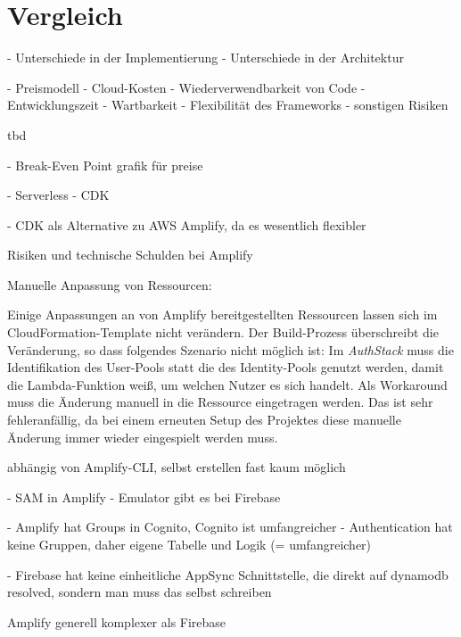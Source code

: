 \chapter{Vergleich}

- Unterschiede in der Implementierung
- Unterschiede in der Architektur

- Preismodell
- Cloud-Kosten
- Wiederverwendbarkeit von Code
- Entwicklungszeit
- Wartbarkeit
- Flexibilität des Frameworks
- sonstigen Risiken

tbd

- Break-Even Point grafik für preise

- Serverless
- CDK

- CDK als Alternative zu AWS Amplify, da es wesentlich flexibler

Risiken und technische Schulden bei Amplify

Manuelle Anpassung von Ressourcen:

Einige Anpassungen an von Amplify bereitgestellten Ressourcen lassen sich im CloudFormation-Template nicht verändern. Der Build-Prozess überschreibt die Veränderung, so dass folgendes Szenario nicht möglich ist: Im \textit{AuthStack} muss die Identifikation des User-Pools statt die des Identity-Pools genutzt werden, damit die Lambda-Funktion weiß, um welchen Nutzer es sich handelt. Als Workaround muss die Änderung manuell in die Ressource eingetragen werden. Das ist sehr fehleranfällig, da bei einem erneuten Setup des Projektes diese manuelle Änderung immer wieder eingespielt werden muss.

abhängig von Amplify-CLI, selbst erstellen fast kaum möglich


- SAM in Amplify
- Emulator gibt es bei Firebase

- Amplify hat Groups in Cognito, Cognito ist umfangreicher
- Authentication hat keine Gruppen, daher eigene Tabelle und Logik (= umfangreicher)

- Firebase hat keine einheitliche AppSync Schnittstelle, die direkt auf dynamodb resolved, sondern man muss das selbst schreiben

Amplify generell komplexer als Firebase